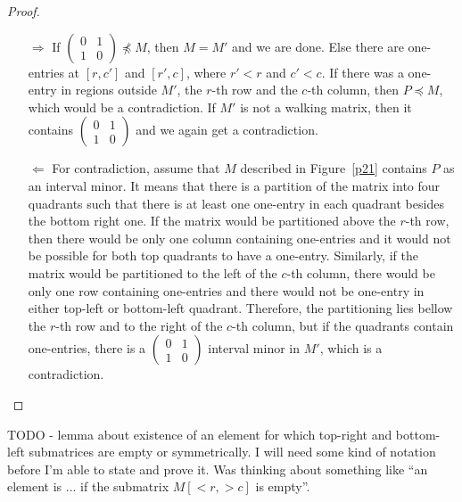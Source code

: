 \documentclass[12pt,a4paper]{report}
\begin{document}
\begin{proof}
\begin{itemize}
\item[$\Rightarrow$] If $\left(\begin{smallmatrix}0&1\\1&0\end{smallmatrix}\right)\not\preceq M$, then $M=M'$ and we are done. Else there are one-entries at $[r,c']$ and $[r',c]$, where $r'<r$ and $c'<c$. If there was a one-entry in regions outside $M'$, the $r$-th row and the $c$-th column, then $P\preceq M$, which would be a contradiction. If $M'$ is not a walking matrix, then it contains $\left(\begin{smallmatrix}0&1\\1&0\end{smallmatrix}\right)$ and we again get a contradiction.
\item[$\Leftarrow$] For contradiction, assume that $M$ described in Figure~\ref{p21} contains $P$ as an interval minor. It means that there is a partition of the matrix into four quadrants such that there is at least one one-entry in each quadrant besides the bottom right one. If the matrix would be partitioned above the $r$-th row, then there would be only one column containing one-entries and it would not be possible for both top quadrants to have a one-entry. Similarly, if the matrix would be partitioned to the left of the $c$-th column, there would be only one row containing one-entries and there would not be one-entry in either top-left or bottom-left quadrant. Therefore, the partitioning lies bellow the $r$-th row and to the right of the $c$-th column, but if the quadrants contain one-entries, there is a $\left(\begin{smallmatrix}0&1\\1&0\end{smallmatrix}\right)$ interval minor in $M'$, which is a contradiction.
\end{itemize}
\end{proof}
\begin{lemma}
\label{lemma1}
TODO - lemma about existence of an element for which top-right and bottom-left submatrices are empty or symmetrically. I will need some kind of notation before I'm able to state and prove it. Was thinking about something like ``an element is ... if the submatrix $M[<r,>c]$ is empty''.
\end{lemma}
\end{document}
